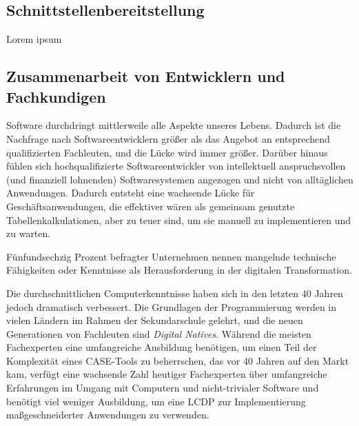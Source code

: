 \documentclass[12pt]{article} %
\begin{document}
	
	\subsection{Schnittstellenbereitstellung} 
	Lorem ipsum
	
	\subsection{Zusammenarbeit von Entwicklern und Fachkundigen}		
	Software durchdringt mittlerweile alle Aspekte unseres Lebens. Dadurch ist die Nachfrage nach Softwareentwicklern größer als das Angebot an entsprechend qualifizierten Fachleuten, und die Lücke wird immer größer. Darüber hinaus fühlen sich hochqualifizierte Softwareentwickler von intellektuell anspruchsvollen (und finanziell lohnenden) Softwaresystemen angezogen und nicht von alltäglichen Anwendungen. Dadurch entsteht eine wachsende Lücke für Geschäftsanwendungen, die effektiver wären als gemeinsam genutzte Tabellenkalkulationen, aber zu teuer sind, um sie manuell zu implementieren und zu warten. %

	Fünfundsechzig Prozent befragter Unternehmen nennen mangelnde technische Fähigkeiten oder Kenntnisse als Herausforderung in der digitalen Transformation. \cite{EmmaVanPelt.2019} \newline %
	
	Die durchschnittlichen Computerkenntnisse haben sich in den letzten 40 Jahren jedoch dramatisch verbessert. Die Grundlagen der Programmierung werden in vielen Ländern im Rahmen der Sekundarschule gelehrt, und die neuen Generationen von Fachleuten sind \emph{Digital Natives}. Während die meisten Fachexperten eine umfangreiche Ausbildung benötigen, um einen Teil der Komplexität eines CASE-Tools zu beherrschen, das vor 40 Jahren auf den Markt kam, verfügt eine wachsende Zahl heutiger Fachexperten über umfangreiche Erfahrungen im Umgang mit Computern und nicht-trivialer Software und benötigt viel weniger Ausbildung, um eine LCDP zur Implementierung maßgeschneiderter Anwendungen zu verwenden.\cite{DiRuscio.2022} \newline
	
\end{document}
